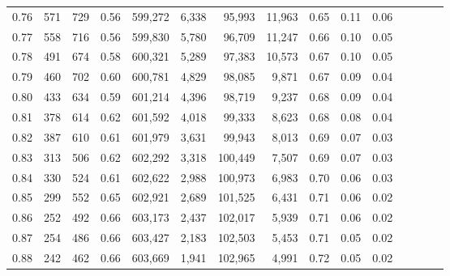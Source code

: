 \begin{tabular}{rrrcrrrrrrrrrrr}
0.76 &     571 &    729 &                                       0.56 &  599,272 &    6,338 &   95,993 &   11,963 &  0.65 &  0.11 &                         0.06 \\
0.77 &     558 &    716 &                                       0.56 &  599,830 &    5,780 &   96,709 &   11,247 &  0.66 &  0.10 &                         0.05 \\
0.78 &     491 &    674 &                                       0.58 &  600,321 &    5,289 &   97,383 &   10,573 &  0.67 &  0.10 &                         0.05 \\
0.79 &     460 &    702 &                                       0.60 &  600,781 &    4,829 &   98,085 &    9,871 &  0.67 &  0.09 &                         0.04 \\
0.80 &     433 &    634 &                                       0.59 &  601,214 &    4,396 &   98,719 &    9,237 &  0.68 &  0.09 &                         0.04 \\
0.81 &     378 &    614 &                                       0.62 &  601,592 &    4,018 &   99,333 &    8,623 &  0.68 &  0.08 &                         0.04 \\
0.82 &     387 &    610 &                                       0.61 &  601,979 &    3,631 &   99,943 &    8,013 &  0.69 &  0.07 &                         0.03 \\
0.83 &     313 &    506 &                                       0.62 &  602,292 &    3,318 &  100,449 &    7,507 &  0.69 &  0.07 &                         0.03 \\
0.84 &     330 &    524 &                                       0.61 &  602,622 &    2,988 &  100,973 &    6,983 &  0.70 &  0.06 &                         0.03 \\
0.85 &     299 &    552 &                                       0.65 &  602,921 &    2,689 &  101,525 &    6,431 &  0.71 &  0.06 &                         0.02 \\
0.86 &     252 &    492 &                                       0.66 &  603,173 &    2,437 &  102,017 &    5,939 &  0.71 &  0.06 &                         0.02 \\
0.87 &     254 &    486 &                                       0.66 &  603,427 &    2,183 &  102,503 &    5,453 &  0.71 &  0.05 &                         0.02 \\
0.88 &     242 &    462 &                                       0.66 &  603,669 &    1,941 &  102,965 &    4,991 &  0.72 &  0.05 &                         0.02 \\

\end{tabular}
